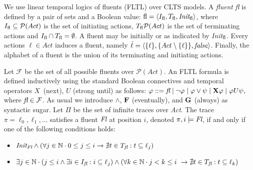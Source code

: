 We use linear temporal logics of fluents (FLTL) over CLTS models. %
A \emph{fluent} \emph{fl} is defined by a pair of sets and a Boolean value: $\emph{\emph{fl}} = \langle I_{\emph{\emph{fl}}}, T_{\emph{\emph{fl}}}, \emph{Init}_{\emph{\emph{fl}}} \rangle$, where $I_{\emph{\emph{fl}}}\subseteq \mathcal{P}(Act)$ is the set of initiating actions, $T_{\emph{\emph{fl}}} \mathcal{P}(Act)$ is the set of terminating actions and $I_{\emph{\emph{fl}}}\cap T_{\emph{\emph{fl}}}=\emptyset$. 
A fluent may be initially \true or \false as indicated by \emph{Init}$_{\emph{\emph{fl}}}$. 
Every actions $\ell\in Act$ induces a fluent, namely $\dot{\ell}=\langle \{\ell\}, \{Act\setminus \{\ell\}\}, \emph{false}\rangle$. 
Finally, the alphabet of a fluent is the union of its terminating and initiating actions.

Let $\mathcal{F}$ be the set of all possible fluents over $\mathcal{P}(Act)$. 
An FLTL formula is defined inductively using the standard Boolean connectives and temporal operators $X$~(next), $U$ (strong until) as follows: 
$\varphi ::= \emph{fl} \mid \neg \varphi \mid \varphi \vee \psi \mid {\bf X} \varphi \mid \varphi U \psi,$
where $\emph{fl}\in\mathcal{F}$. 
As usual we introduce $\wedge$, ${\bf F}$ (eventually), and ${\bf G}$ (always) as syntactic sugar. 
Let $\Pi$ be the set of infinite traces over \emph{Act}.
The trace $\pi=\ell_0,\ell_1,\ldots$ satisfies a fluent $\emph{Fl}$ at position $i$, denoted $\pi,i \models \emph{Fl}$, if and only if one of the following conditions holds:
\begin{itemize}%
	\item $\emph{Init}_{\emph{Fl}} \wedge (\forall j \in \mathbb{N} \cdot 0 \leq j \leq i \rightarrow \nexists t \in T_{\emph{fl}}: t \subseteq \ell_j)$
	\item $\exists j \in \mathbb{N} \cdot (j \leq i \wedge \exists i \in I_{\emph{fl}}: i \subseteq \ell_j) \wedge (\forall k \in \mathbb{N} \cdot j < k \leq i \ \rightarrow \nexists t \in T_{\emph{fl}}: t \subseteq \ell_k)$
\end{itemize}

